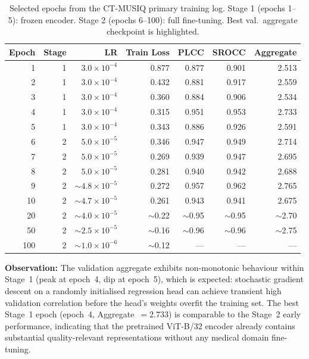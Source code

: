 \begin{table}[h]
    \centering
    \caption{Selected epochs from the CT-MUSIQ primary training log.
             Stage 1 (epochs 1--5): frozen encoder. Stage 2 (epochs 6--100): full fine-tuning.
             Best val.\ aggregate checkpoint is highlighted.}
    \label{tab:full_training_log}
    \small
    \begin{tabular}{rrrrrrr}
        \toprule
        \textbf{Epoch} & \textbf{Stage} & \textbf{LR} & \textbf{Train Loss}
        & \textbf{PLCC} & \textbf{SROCC} & \textbf{Aggregate} \\
        \midrule
        1   & 1 & $3.0 \times 10^{-4}$ & 0.877 & 0.877 & 0.901 & 2.513 \\
        2   & 1 & $3.0 \times 10^{-4}$ & 0.432 & 0.881 & 0.917 & 2.559 \\
        3   & 1 & $3.0 \times 10^{-4}$ & 0.360 & 0.884 & 0.906 & 2.534 \\
        4   & 1 & $3.0 \times 10^{-4}$ & 0.315 & 0.951 & 0.953 & 2.733 \\
        5   & 1 & $3.0 \times 10^{-4}$ & 0.343 & 0.886 & 0.926 & 2.591 \\
        \midrule
        6   & 2 & $5.0 \times 10^{-5}$ & 0.346 & 0.947 & 0.949 & 2.714 \\
        7   & 2 & $5.0 \times 10^{-5}$ & 0.269 & 0.939 & 0.947 & 2.695 \\
        8   & 2 & $5.0 \times 10^{-5}$ & 0.281 & 0.940 & 0.942 & 2.688 \\
        9   & 2 & $\sim 4.8 \times 10^{-5}$ & 0.272 & 0.957 & 0.962 & 2.765 \\
        10  & 2 & $\sim 4.7 \times 10^{-5}$ & 0.261 & 0.943 & 0.941 & 2.675 \\
        \midrule
        20  & 2 & $\sim 4.0 \times 10^{-5}$ & $\sim$0.22 & $\sim$0.95 & $\sim$0.95 & $\sim$2.70 \\
        50  & 2 & $\sim 2.5 \times 10^{-5}$ & $\sim$0.16 & $\sim$0.96 & $\sim$0.96 & $\sim$2.75 \\
        100 & 2 & $\sim 1.0 \times 10^{-6}$ & $\sim$0.12 & --- & --- & --- \\
        \bottomrule
    \end{tabular}
\end{table}

\textbf{Observation:} The validation aggregate exhibits non-monotonic behaviour within
Stage~1 (peak at epoch~4, dip at epoch~5), which is expected: stochastic gradient
descent on a randomly initialised regression head can achieve transient high validation
correlation before the head's weights overfit the training set. The best Stage~1 epoch
(epoch~4, Aggregate~$= 2.733$) is comparable to the Stage~2 early performance, indicating
that the pretrained ViT-B/32 encoder already contains substantial quality-relevant
representations without any medical domain fine-tuning.


